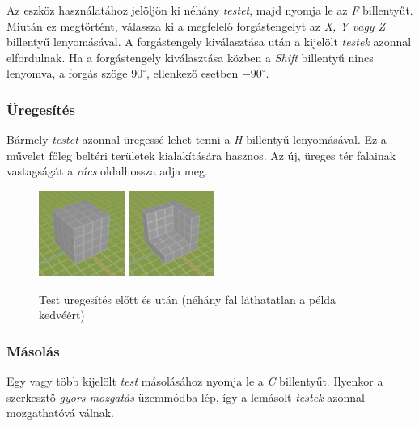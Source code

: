 Az eszköz használatához jelöljön ki néhány \emph{testet}, majd nyomja le az \emph{F} billentyűt.
Miután ez megtörtént, válassza ki a megfelelő forgástengelyt az \emph{X, Y vagy Z} billentyű
lenyomásával. A forgástengely kiválasztása után a kijelölt \emph{testek} azonnal elfordulnak.
Ha a forgástengely kiválasztása közben a \emph{Shift} billentyű nincs lenyomva, a forgás szöge
$90^{\circ}$, ellenkező esetben $-90^{\circ}$.

\subsubsection{Üregesítés}

Bármely \emph{testet} azonnal üregessé lehet tenni a \emph{H} billentyű lenyomásával. Ez a művelet
főleg beltéri területek kialakítására hasznos. Az új, üreges tér falainak vastagságát a \emph{rács}
oldalhossza adja meg.

\begin{figure}[h]
    \centering
    \includegraphics[width=0.25\textwidth]{parts/user-documentation/editor/images/hollow1.png}
    \includegraphics[width=0.25\textwidth]{parts/user-documentation/editor/images/hollow2.png}
    \caption{Test üregesítés előtt és után (néhány fal láthatatlan a példa kedvéért)}
\end{figure}

\subsubsection{Másolás}

Egy vagy több kijelölt \emph{test} másolásához nyomja le a \emph{C} billentyűt. Ilyenkor a
szerkesztő \emph{gyors mozgatás} üzemmódba lép, így a lemásolt \emph{testek} azonnal mozgathatóvá
válnak.

